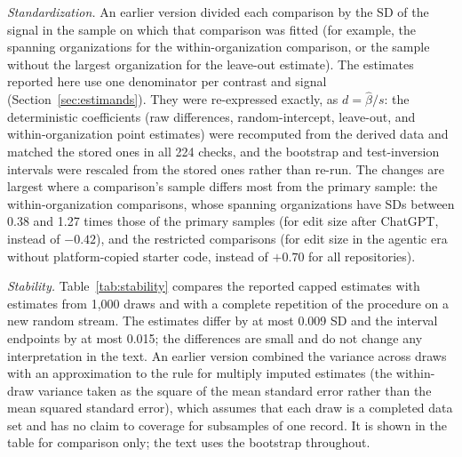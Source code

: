 \documentclass[acmsmall,screen,review,anonymous]{acmart}
\begin{document}
\textit{Standardization.} An earlier version divided each comparison by the SD of the signal in the sample on which that comparison was fitted (for example, the spanning organizations for the within-organization comparison, or the sample without the largest organization for the leave-out estimate). The estimates reported here use one denominator per contrast and signal (Section~\ref{sec:estimands}). They were re-expressed exactly, as $d = \hat\beta / s$: the deterministic coefficients (raw differences, random-intercept, leave-out, and within-organization point estimates) were recomputed from the derived data and matched the stored ones in all 224 checks, and the bootstrap and test-inversion intervals were rescaled from the stored ones rather than re-run. The changes are largest where a comparison's sample differs most from the primary sample: the within-organization comparisons, whose spanning organizations have SDs between 0.38 and 1.27 times those of the primary samples (for edit size after ChatGPT,  instead of $-0.42$), and the restricted comparisons (for edit size in the agentic era without platform-copied starter code,  instead of $+0.70$ for all repositories).

\textit{Stability.} Table~\ref{tab:stability} compares the reported capped estimates with estimates from 1,000 draws and with a complete repetition of the procedure on a new random stream. The estimates differ by at most 0.009 SD and the interval endpoints by at most 0.015; the differences are small and do not change any interpretation in the text. An earlier version combined the variance across draws with an approximation to the rule for multiply imputed estimates \citep{rubin1987imputation} (the within-draw variance taken as the square of the mean standard error rather than the mean squared standard error), which assumes that each draw is a completed data set and has no claim to coverage for subsamples of one record. It is shown in the table for comparison only; the text uses the bootstrap throughout.


\end{document}
